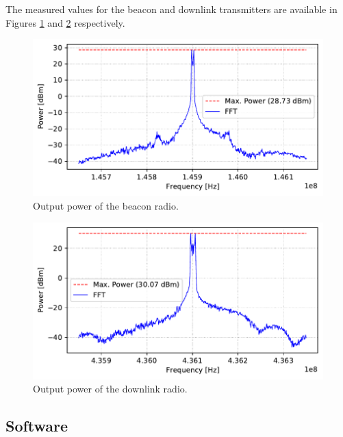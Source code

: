 The measured values for the beacon and downlink transmitters are available in Figures \ref{fig:beacon-power} and \ref{fig:downlink-power} respectively.

\begin{figure}[!ht]
    \begin{center}
        \includegraphics[width=\textwidth]{curves/beacon_output_power.pdf}
        \caption{Output power of the beacon radio.}
        \label{fig:beacon-power}
    \end{center}
\end{figure}

\begin{figure}[!ht]
    \begin{center}
        \includegraphics[width=\textwidth]{curves/downlink_output_power.pdf}
        \caption{Output power of the downlink radio.}
        \label{fig:downlink-power}
    \end{center}
\end{figure}

\subsection{Software}

